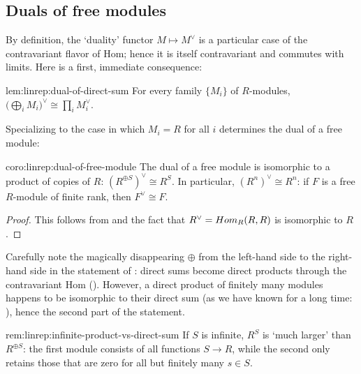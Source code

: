 \subsection{Duals of free modules}
\label{subsec:linrep:duals-of-free-modules}
By definition, the `duality' functor $M \mapsto M^\vee$ is a
particular case of the contravariant flavor of Hom; hence it is itself
contravariant and commutes with limits. Here is a first, immediate
consequence:

\begin{lem}{}{lem:linrep:dual-of-direct-sum}
  For every family $\{M_i\}$ of $R$-modules,
  $\bigl(\bigoplus_i M_i\bigr)^\vee \cong \prod_i M_i^\vee$.
\end{lem}

Specializing to the case in which $M_i = R$ for all $i$ determines the
dual of a free module:

\begin{coro}{}{coro:linrep:dual-of-free-module}
  The dual of a free module is isomorphic to a product of copies of
  $R$: $(R^{\oplus S})^\vee \cong R^S$. In particular,
  $(R^n)^\vee \cong R^n$: if $F$ is a free $R$-module of finite rank,
  then $F^\vee \cong F$.
\end{coro}
\begin{proof}
  This follows from  and the fact that
  $R^\vee = Hom_R(R, R)$ is isomorphic to $R$.
\end{proof}

Carefully note the magically disappearing $\oplus$ from the left-hand
side to the right-hand side in the statement of
: direct sums become direct products through
the contravariant Hom ().  However, a direct
product of finitely many modules happens to be isomorphic to their
direct sum (as we have known for a long time:
), hence the second part
of the statement.

\begin{rem}{}{rem:linrep:infinite-product-vs-direct-sum}
  If $S$ is infinite, $R^S$ is `much larger' than $R^{\oplus S}$: the
  first module consists of all functions $S \to R$, while the second
  only retains those that are zero for all but finitely many
  $s \in S$.
\end{rem}

